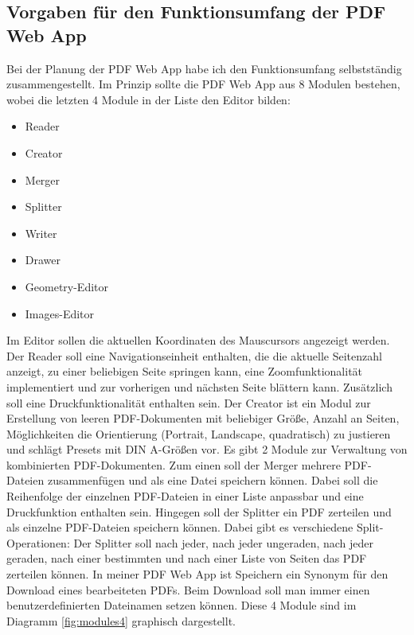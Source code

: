 \subsection{Vorgaben für den Funktionsumfang der PDF Web App}
Bei der Planung der PDF Web App habe ich den Funktionsumfang selbstständig zusammengestellt. Im Prinzip sollte die PDF Web App aus 8 Modulen bestehen, wobei die letzten 4 Module in der Liste den Editor bilden:

\begin{itemize}
	\item Reader
	\item Creator
	\item Merger
	\item Splitter
	\item Writer
	\item Drawer
	\item Geometry-Editor
	\item Images-Editor
\end{itemize}

Im Editor sollen die aktuellen Koordinaten des Mauscursors angezeigt werden. Der Reader soll eine Navigationseinheit enthalten, die die aktuelle Seitenzahl anzeigt, zu einer beliebigen Seite springen kann, eine Zoomfunktionalität implementiert und zur vorherigen und nächsten Seite blättern kann. Zusätzlich soll eine Druckfunktionalität enthalten sein. Der Creator ist ein Modul zur Erstellung von leeren PDF-Dokumenten mit beliebiger Größe, Anzahl an Seiten, Möglichkeiten die Orientierung (Portrait, Landscape, quadratisch) zu justieren und schlägt Presets mit DIN A-Größen vor. Es gibt 2 Module zur Verwaltung von kombinierten PDF-Dokumenten. Zum einen soll der Merger mehrere PDF-Dateien zusammenfügen und als eine Datei speichern können. Dabei soll die Reihenfolge der einzelnen PDF-Dateien in einer Liste anpassbar und eine Druckfunktion enthalten sein. Hingegen soll der Splitter ein PDF zerteilen und als einzelne PDF-Dateien speichern können. Dabei gibt es verschiedene Split-Operationen: Der Splitter soll nach jeder, nach jeder ungeraden, nach jeder geraden, nach einer bestimmten und nach einer Liste von Seiten das PDF zerteilen können. In meiner PDF Web App ist Speichern ein Synonym für den Download eines bearbeiteten PDFs. Beim Download soll man immer einen benutzerdefinierten Dateinamen setzen können. Diese 4 Module sind im Diagramm \ref{fig:modules4} graphisch dargestellt. 

